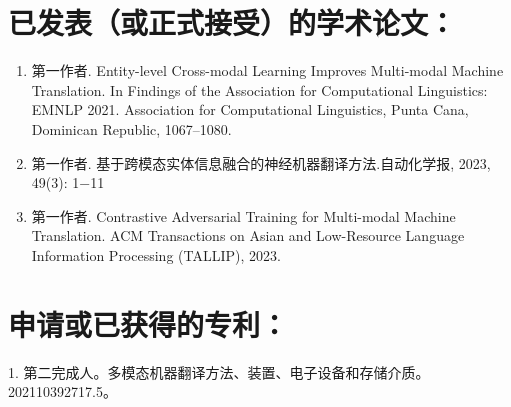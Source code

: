 
\section*{已发表（或正式接受）的学术论文：}

{
\setlist[enumerate]{}%
\begin{enumerate}[nosep]
    \item 第一作者. Entity-level Cross-modal Learning Improves Multi-modal Machine Translation. In Findings of the Association for Computational Linguistics: EMNLP 2021. Association for Computational Linguistics, Punta Cana, Dominican Republic, 1067–1080.
    \item 第一作者. 基于跨模态实体信息融合的神经机器翻译方法.自动化学报, 2023, 49(3): 1−11
    \item 第一作者. Contrastive Adversarial Training for Multi-modal Machine Translation. ACM Transactions on Asian and Low-Resource Language Information Processing (TALLIP), 2023.
\end{enumerate}
}

\section*{申请或已获得的专利：}

1. 第二完成人。多模态机器翻译方法、装置、电子设备和存储介质。202110392717.5。


\cleardoublepage[plain]%

